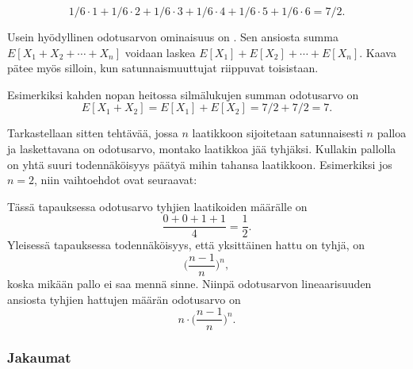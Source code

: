 \[1/6 \cdot 1 + 1/6 \cdot 2 + 1/6 \cdot 3 + 1/6 \cdot 4 + 1/6 \cdot 5 + 1/6 \cdot 6 = 7/2.\]

Usein hyödyllinen odotusarvon ominaisuus on .
Sen ansiosta summa $E[X_1+X_2+\cdots+X_n]$ voidaan laskea $E[X_1]+E[X_2]+\cdots+E[X_n]$.
Kaava pätee myös silloin, kun satunnaismuuttujat riippuvat toisistaan.

Esimerkiksi kahden nopan heitossa silmälukujen summan odotusarvo on
\[E[X_1+X_2]=E[X_1]+E[X_2]=7/2+7/2=7.\]

Tarkastellaan sitten tehtävää,
jossa $n$ laatikkoon sijoitetaan
satunnaisesti $n$ palloa
ja laskettavana on odotusarvo,
montako laatikkoa jää tyhjäksi.
Kullakin pallolla on yhtä suuri todennäköisyys
päätyä mihin tahansa laatikkoon.
Esimerkiksi jos $n=2$, niin
vaihtoehdot ovat seuraavat:
\begin{center}
\end{center}
Tässä tapauksessa odotusarvo
tyhjien laatikoiden määrälle on
\[\frac{0+0+1+1}{4} = \frac{1}{2}.\]
Yleisessä tapauksessa
todennäköisyys, että yksittäinen hattu on tyhjä,
on
\[\Big(\frac{n-1}{n}\Big)^n,\]
koska mikään pallo ei saa mennä sinne.
Niinpä odotusarvon lineaarisuuden ansiosta tyhjien hattujen
määrän odotusarvo on
\[n \cdot \Big(\frac{n-1}{n}\Big)^n.\]

\subsubsection{Jakaumat}


